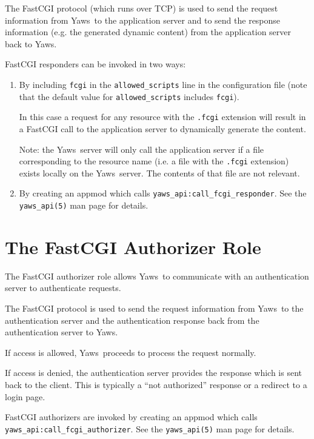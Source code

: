 \documentclass[11pt,oneside,english]{book}
\newcommand{\Yaws}            %
        {{\sc Yaws}}
\begin{document}
The FastCGI protocol (which runs over TCP) is used to send the request
information from \Yaws\  to the application server and to send the
response information (e.g. the generated dynamic content) from
the application server back to \Yaws{}.

FastCGI responders can be invoked in two ways:

\begin{enumerate}

\item
By including \verb+fcgi+ in the \verb+allowed_scripts+ line
in the configuration file (note that the default value for
\verb+allowed_scripts+ includes \verb+fcgi+).

In this case a request for any resource with the \verb+.fcgi+
extension will result in a FastCGI call to the application server to
dynamically generate the content.

Note: the \Yaws\  server will only call the application server if a file
corresponding to the resource name (i.e. a file with the \verb+.fcgi+
extension) exists locally on the \Yaws\  server. The contents of that
file are not relevant.

\item
By creating an appmod which calls \verb+yaws_api:call_fcgi_responder+.
See the \verb+yaws_api(5)+ man page for details.

\end{enumerate}

\section{The FastCGI Authorizer Role}

The FastCGI authorizer role allows \Yaws\  to communicate with an
authentication server to authenticate requests.

The FastCGI protocol is used to send the request information from
\Yaws\ to the authentication server and the authentication response
back from the authentication server to \Yaws{}.

If access is allowed, \Yaws\ proceeds to process the request normally.

If access is denied, the authentication server provides the
response which is sent back to the client. This is typically
a ``not authorized'' response or a redirect to a login page.

FastCGI authorizers are invoked by creating an appmod which
calls \verb+yaws_api:call_fcgi_authorizer+.
See the \verb+yaws_api(5)+ man page for details.
\end{document}
